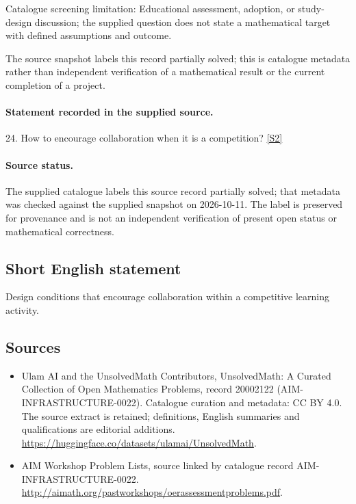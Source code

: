 \documentclass[11pt]{article}
\begin{document}
Catalogue screening limitation: Educational assessment, adoption, or study-design discussion; the supplied question does not state a mathematical target with defined assumptions and outcome.

The source snapshot labels this record partially solved; this is catalogue metadata rather than independent verification of a mathematical result or the current completion of a project.
\paragraph{Statement recorded in the supplied source.}
24. How to encourage collaboration when it is a competition? \href{http://aimath.org/pastworkshops/oerassessmentproblems.pdf}{[S2]}
\paragraph{Source status.}
The supplied catalogue labels this source record partially solved; that metadata was checked against the supplied snapshot on 2026-10-11. The label is preserved for provenance and is not an independent verification of present open status or mathematical correctness.
\subsection{Short English statement}
Design conditions that encourage collaboration within a competitive learning activity.
\subsection{Sources}
\begin{itemize}
\item[S1] Ulam AI and the UnsolvedMath Contributors, UnsolvedMath: A Curated Collection of Open Mathematics Problems, record 20002122 (AIM-INFRASTRUCTURE-0022). Catalogue curation and metadata: CC BY 4.0. The source extract is retained; definitions, English summaries and qualifications are editorial additions.
\url{https://huggingface.co/datasets/ulamai/UnsolvedMath}.
\item[S2] AIM Workshop Problem Lists, source linked by catalogue record AIM-INFRASTRUCTURE-0022.
\url{http://aimath.org/pastworkshops/oerassessmentproblems.pdf}.
\end{itemize}
\end{document}
